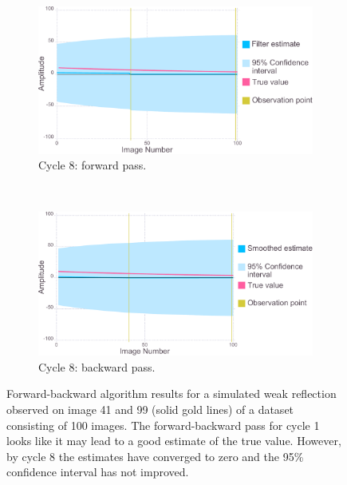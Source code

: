 \begin{figure}
    \ContinuedFloat
    \begin{subfigure}[b]{1.0\textwidth}
        \centering
        \includegraphics[width=\textwidth]{figures/datared/intDecSim_Filt8_bad.pdf}
        \caption{Cycle 8: forward pass.}
        \label{fig:UKF simulation results - cycle 8 - bad}
    \end{subfigure}
    \\
    \begin{subfigure}[b]{1.0\textwidth}
        \centering
        \includegraphics[width=\textwidth]{figures/datared/intDecSim8_bad.pdf}
        \caption{Cycle 8: backward pass.}
        \label{fig:URTSS simulation results - cycle 8 - bad}
    \end{subfigure}
    \caption[Forward-backward algorithm results for simulated data for a weak reflection.]{Forward-backward algorithm results for a simulated weak reflection observed on image 41 and 99 (solid gold lines) of a dataset consisting of 100 images.
    The forward-backward pass for cycle 1 looks like it may lead to a good estimate of the true value.
    However, by cycle 8 the estimates have converged to zero and the 95\% confidence interval has not improved.}
    \label{fig:forward-backward algorithm simulation results - bad}
\end{figure}

